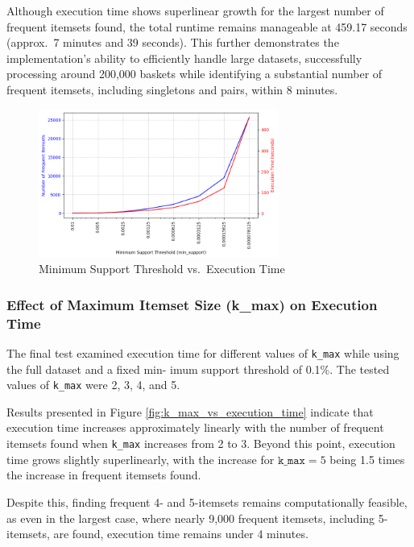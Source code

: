 \documentclass{Class/julia}
\begin{document}
Although execution time shows superlinear growth for the largest number of frequent itemsets found, the total runtime remains manageable at 459.17 seconds (approx.\ 7 minutes and 39 seconds). This further demonstrates the implementation's ability to efficiently handle large datasets, successfully processing around 200,000 baskets while identifying a substantial number of frequent itemsets, including singletons and pairs, within 8 minutes.

\begin{figure}[!ht]
    \centering
    \includegraphics[width=0.7\textwidth]{min_support_vs_execution_time.png}
    \caption{Minimum Support Threshold vs.\ Execution Time}
    \label{fig:min_support_vs_execution_time}
\end{figure}

\subsubsection{Effect of Maximum Itemset Size (k\_max) on Execution Time}

The final test examined execution time for different values of \texttt{k\_max} while using the full dataset and a fixed min- imum support threshold of 0.1\%. The tested values of \texttt{k\_max} were 2, 3, 4, and 5.  

Results presented in Figure \ref{fig:k_max_vs_execution_time} indicate that execution time increases approximately linearly with the number of frequent itemsets found when \texttt{k\_max} increases from 2 to 3. Beyond this point, execution time grows slightly superlinearly, with the increase for \( \texttt{k\_max} = 5 \) being 1.5 times the increase in frequent itemsets found.

Despite this, finding frequent 4- and 5-itemsets remains computationally feasible, as even in the largest case, where nearly 9,000 frequent itemsets, including 5-itemsets, are found, execution time remains under 4 minutes.
\end{document}
